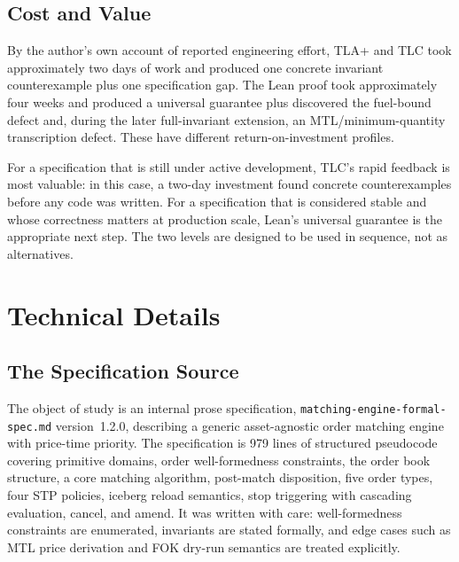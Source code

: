\documentclass[11pt,a4paper]{article}
\begin{document}
\subsection{Cost and Value}
\label{sec:lessons-cost}

By the author's own account of reported engineering effort, TLA+ and
TLC took approximately two days of work and produced one concrete
invariant counterexample plus one specification gap. The Lean proof
took approximately four weeks and produced a universal guarantee plus
discovered the fuel-bound defect and, during the later full-invariant
extension, an MTL/minimum-quantity transcription defect. These have
different return-on-investment profiles.

For a specification that is still under active development, TLC's rapid
feedback is most valuable: in this case, a two-day investment found
concrete counterexamples before any code was written. For a specification that is
considered stable and whose correctness matters at production scale,
Lean's universal guarantee is the appropriate next step. The two levels
are designed to be used in sequence, not as alternatives.


\section{Technical Details}
\label{sec:technical}

\subsection{The Specification Source}
\label{sec:spec-source}

The object of study is an internal prose specification,
\texttt{matching-engine-formal-spec.md} version~1.2.0, describing a
generic asset-agnostic order matching engine with price-time priority.
The specification is 979 lines of structured pseudocode covering
primitive domains, order well-formedness constraints, the order book
structure, a core matching algorithm, post-match disposition, five order
types, four STP policies, iceberg reload semantics, stop triggering with
cascading evaluation, cancel, and amend. It was written with care:
well-formedness constraints are enumerated, invariants are stated
formally, and edge cases such as MTL price derivation and FOK dry-run
semantics are treated explicitly.
\end{document}
